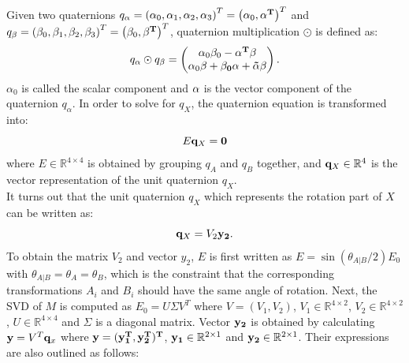 \documentclass[twocolumn,10pt]{asme2ej}
\newcommand{\qq}{{\bf q}}
\begin{document}
Given two quaternions $q_{\alpha} = \left( \alpha_{0}, \alpha_{1}, \alpha_{2},\alpha_{3} \right)^{T} = \left( \alpha_{0}, \bf{\alpha}^{T} \right)^{T}$ and $q_{\beta} = \left( \beta_{0}, \beta_{1}, \beta_{2},\beta_{3} \right)^{T} = \left(\beta_{0}, \bf{\beta}^{T} \right)^{T}$, quaternion multiplication $\odot$ is defined as:
\begin{equation}
q_{\alpha}\odot q_{\beta} = 
\left(
\begin{matrix}
\alpha_{0} \beta_{0} - \bf{\alpha}^{T}\bf{\beta}\\
\alpha_{0}\bf{\beta} + \beta_{0}\bf{\alpha} + \bf{\tilde{\alpha}\beta}
\end{matrix}
\right).
\end{equation}
$\alpha_{0}$ is called the scalar component and $\bf{\alpha}$ is the vector component of the quaternion $q_{\alpha}$.
In order to solve for $q_{X}$, the quaternion equation is transformed into:
\begin{equation}
E\qq_{X} = \bf 0
\end{equation}
where $E \in \mathbb{R}^{4 \times 4}$ is obtained by grouping $q_{A}$ and $q_{B}$ together, and $\qq_{X} \in \mathbb{R}^4$ is the vector representation of the unit quaternion ${q_X}$.\\

It turns out that the unit quaternion $q_X$ which represents the rotation part of $X$ can be written as: 
\begin{equation}
\qq_{X} = V_{2}\bf y_{2}.
\label{QuaternionUnit}
\end{equation}
To obtain the matrix $V_{2}$ and vector $y_{2}$, $E$ is first written as $E =  \sin(\theta_{A|B}/2)E_0$ with $\theta_{A|B} = \theta_{A} = \theta_{B}$, which is the constraint that the corresponding transformations $A_i$ and $B_i$ should have the same angle of rotation. Next, the SVD of $M$ is computed as $E_0 = U\Sigma V^{T}$ where $V = (V_{1}, V_{2})$,  $V_{1} \in \mathbb{R}^{4 \times 2}$, $V_{2} \in \mathbb{R}^{4 \times 2}$, $U \in \mathbb{R}^{4 \times 4}$ and $\Sigma$ is a diagonal matrix. Vector ${\bf y_{2}}$ is obtained by calculating ${\bf y} =  V^{T}\qq_{x}$ where $\bf y = (\bf y^{T}_{1},\bf y^{T}_{2} )^{T}$, ${\bf y_{1}} \in \mathbb{R}^{2 \times 1}$ and ${\bf y_{2}} \in \mathbb{R}^{2 \times 1}$. Their expressions are also outlined as follows:\\
\end{document}
